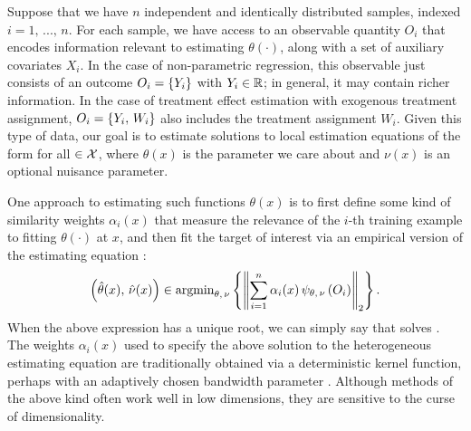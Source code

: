 \documentclass[aos]{imsart}
\theoremstyle{plain}
\theoremstyle{definition}
\theoremstyle{remark}
\begin{document}
\begin{CJK}{UTF8}{gbsn}
Suppose that we have $n$ independent and identically distributed samples, indexed
$ i = 1, \, ..., \, n$. For each sample, we have
access to an observable quantity $O_i$ that encodes information
relevant to estimating $\theta(\cdot)$, along with a set of auxiliary covariates $X_i$. In the case of non-parametric
regression, this observable just consists of an outcome $O_i = \left\{Y_i\right\}$ with $Y_i \in \mathbb{R}$; in
general, it may contain richer information. In the case of treatment effect
estimation with exogenous treatment assignment, $O_i = \left\{Y_i, \, W_i\right\}$ also includes the treatment
assignment $W_i$.
Given this type of data, our goal is to estimate solutions to local estimation equations
of the form
 for all $\in \mathcal{X}$, 
where $\theta(x)$ is the parameter we care about and $\nu(x)$ is an optional
nuisance parameter.

One approach to estimating such functions $\theta(x)$ is to first define
some kind of similarity weights $\alpha_i(x)$ that measure the relevance of the $i$-th training example to
fitting $\theta(\cdot)$ at $x$, and then fit the target of interest via an empirical version of
the estimating equation
\citep{fan1998local,newey1994kernel,staniswalis1989kernel,stone1977consistent,tibshirani1987local}:
\begin{equation}
\label{eq:gee_estimate}
\p{\htheta(x), \, \hnu(x)} \in \argmin_{\theta, \, \nu} \cb{\Norm{\sum_{i = 1}^n \alpha_i(x) \, \psi_{\theta, \, \nu}\p{O_i}}_2}.
\end{equation}
When the above expression has a unique root, we can simply say that 
solves .
The weights $\alpha_i(x)$ used to specify the above solution to the heterogeneous estimating
equation are traditionally obtained via a deterministic kernel function, perhaps with an adaptively chosen
bandwidth parameter \citep{hastie2009elements}. Although methods of the above kind often work well in low dimensions, they
are sensitive to the curse of dimensionality.


\end{CJK}
\end{document}
